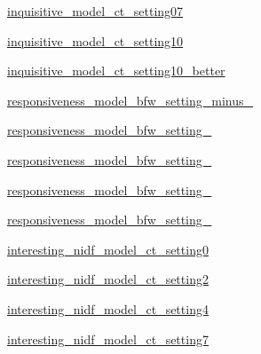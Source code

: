 \begin{DoxyCompactItemize}
\item 
\hyperlink{namespaceprojects_1_1controllable__dialogue_1_1mturk_1_1model__configs_a247fd96bc77511b42433e398313ec4cf}{inquisitive\+\_\+model\+\_\+ct\+\_\+setting07}
\item 
\hyperlink{namespaceprojects_1_1controllable__dialogue_1_1mturk_1_1model__configs_a045e4393093e52d6e673e14cf225b56a}{inquisitive\+\_\+model\+\_\+ct\+\_\+setting10}
\item 
\hyperlink{namespaceprojects_1_1controllable__dialogue_1_1mturk_1_1model__configs_aa873abe289048780716073846be9c954}{inquisitive\+\_\+model\+\_\+ct\+\_\+setting10\+\_\+better}
\item 
\hyperlink{namespaceprojects_1_1controllable__dialogue_1_1mturk_1_1model__configs_aa47466f473f21a0372a6e354ac3de338}{responsiveness\+\_\+model\+\_\+bfw\+\_\+setting\+\_\+minus\+\_}
\item 
\hyperlink{namespaceprojects_1_1controllable__dialogue_1_1mturk_1_1model__configs_a41e11917b3b4de42ac7070b5d6fc5d74}{responsiveness\+\_\+model\+\_\+bfw\+\_\+setting\+\_}
\item 
\hyperlink{namespaceprojects_1_1controllable__dialogue_1_1mturk_1_1model__configs_a469c76422cfb1fc796f8fb0eb9168b2c}{responsiveness\+\_\+model\+\_\+bfw\+\_\+setting\+\_}
\item 
\hyperlink{namespaceprojects_1_1controllable__dialogue_1_1mturk_1_1model__configs_a198674a1be4fd91be530bb12c1968e8b}{responsiveness\+\_\+model\+\_\+bfw\+\_\+setting\+\_}
\item 
\hyperlink{namespaceprojects_1_1controllable__dialogue_1_1mturk_1_1model__configs_a44c0ffe2f6b68f1c546e745cf777e569}{responsiveness\+\_\+model\+\_\+bfw\+\_\+setting\+\_}
\item 
\hyperlink{namespaceprojects_1_1controllable__dialogue_1_1mturk_1_1model__configs_a4d873024c1a682e11773fc2757a1e114}{interesting\+\_\+nidf\+\_\+model\+\_\+ct\+\_\+setting0}
\item 
\hyperlink{namespaceprojects_1_1controllable__dialogue_1_1mturk_1_1model__configs_a829496ae091165c715d76cfe3ccbda4f}{interesting\+\_\+nidf\+\_\+model\+\_\+ct\+\_\+setting2}
\item 
\hyperlink{namespaceprojects_1_1controllable__dialogue_1_1mturk_1_1model__configs_afd3ab429fa064a4cbe84e52ab2e756b8}{interesting\+\_\+nidf\+\_\+model\+\_\+ct\+\_\+setting4}
\item 
\hyperlink{namespaceprojects_1_1controllable__dialogue_1_1mturk_1_1model__configs_a9fbf09843a0d83c5e5d673e4aaa8c2d8}{interesting\+\_\+nidf\+\_\+model\+\_\+ct\+\_\+setting7}

\end{DoxyCompactItemize}
